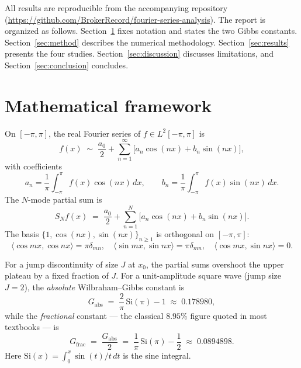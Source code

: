 \documentclass[11pt,a4paper]{article}
\begin{document}
All results are reproducible from the accompanying repository
(\url{https://github.com/BrokerRecord/fourier-series-analysis}).
The report is organized as follows. Section~\ref{sec:math} fixes notation
and states the two Gibbs constants. Section~\ref{sec:method} describes the
numerical methodology. Section~\ref{sec:results} presents the four studies.
Section~\ref{sec:discussion} discusses limitations, and
Section~\ref{sec:conclusion} concludes.

\section{Mathematical framework}
\label{sec:math}

On $[-\pi, \pi]$, the real Fourier series of $f \in L^2[-\pi,\pi]$ is
\begin{equation}
f(x) \;\sim\; \frac{a_0}{2}
    + \sum_{n=1}^{\infty} \bigl[ a_n \cos(nx) + b_n \sin(nx) \bigr],
\label{eq:fs}
\end{equation}
with coefficients
\begin{equation}
a_n = \frac{1}{\pi}\int_{-\pi}^{\pi} f(x)\cos(nx)\,dx,
\qquad
b_n = \frac{1}{\pi}\int_{-\pi}^{\pi} f(x)\sin(nx)\,dx.
\label{eq:coefs}
\end{equation}
The $N$-mode partial sum is
\begin{equation}
S_N f(x) \;=\; \frac{a_0}{2}
    + \sum_{n=1}^{N} \bigl[ a_n \cos(nx) + b_n \sin(nx) \bigr].
\label{eq:partial}
\end{equation}
The basis $\{1,\cos(nx),\sin(nx)\}_{n\ge 1}$ is orthogonal on $[-\pi,\pi]$:
\begin{equation}
\langle \cos mx, \cos nx\rangle = \pi \delta_{mn}, \quad
\langle \sin mx, \sin nx\rangle = \pi \delta_{mn}, \quad
\langle \cos mx, \sin nx\rangle = 0.
\label{eq:orth}
\end{equation}

For a jump discontinuity of size $J$ at $x_0$, the partial sums overshoot the
upper plateau by a fixed fraction of $J$. For a unit-amplitude square wave
(jump size $J=2$), the \emph{absolute} Wilbraham--Gibbs constant is
\begin{equation}
G_{\text{abs}}
    \;=\; \frac{2}{\pi}\,\mathrm{Si}(\pi) - 1
    \;\approx\; 0.178980,
\label{eq:gibbs_abs}
\end{equation}
while the \emph{fractional} constant --- the classical $8.95\%$ figure quoted
in most textbooks --- is
\begin{equation}
G_{\text{frac}}
    \;=\; \frac{G_{\text{abs}}}{2}
    \;=\; \frac{1}{\pi}\,\mathrm{Si}(\pi) - \frac{1}{2}
    \;\approx\; 0.0894898.
\label{eq:gibbs_frac}
\end{equation}
Here $\mathrm{Si}(x) = \int_0^x \sin(t)/t\, dt$ is the sine integral.
\end{document}
